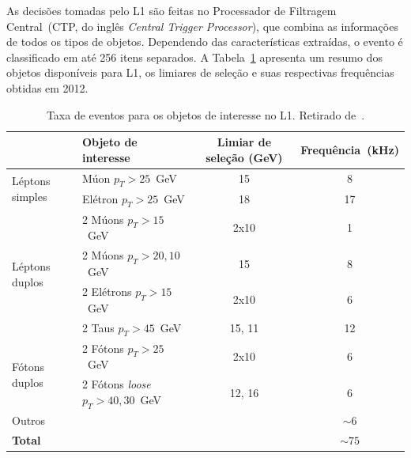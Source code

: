 As decisões tomadas pelo L1 são feitas no Processador de  Filtragem
Central~(CTP, do inglês \emph{Central Trigger Processor}), que combina as
informações de todos os tipos de objetos.  Dependendo das características
extraídas, o evento é classificado em até 256 itens separados. A
Tabela~\ref{table:l1objects} apresenta um resumo dos objetos disponíveis para
L1, os limiares de seleção e suas respectivas frequências obtidas em 2012.

\begin{table}[htbp!]\footnotesize
  \centering
  \tabcolsep=0.08cm
  \begin{tabular}{ l  m{5cm} c c }
      \toprule
                                          & Objeto de interesse & Limiar de seleção (GeV) & Frequência~(kHz) \\
      \midrule
      \multirow{2}{*}{Léptons simples}    & Múon $p_T > 25$~GeV        &      15             & 8        \\
                                          & Elétron $p_T > 25$~GeV     &      18             & 17       \\
      \midrule
      \multirow{4}{*}{Léptons duplos}     & 2 Múons $p_T > 15$~GeV     &      2x10           & 1        \\
                                          & 2 Múons $p_T > 20,10$~GeV  &      15             & 8        \\
                                          & 2 Elétrons $p_T > 15$~GeV  &      2x10           & 6        \\
                                          & 2 Taus $p_T > 45$~GeV      &      15, 11         & 12       \\
      \midrule
      \multirow{2}{*}{Fótons  duplos}     & 2 Fótons $p_T > 25$~GeV    &   2x10              & 6        \\
                                          & 2 Fótons \emph{loose} $p_T > 40,30$~GeV & 12, 16 & 6        \\
      \midrule
      Outros                              &                            &                     & $\sim 6$ \\
      \midrule
      {\bf Total}                         &                            &                     & $\sim 75$ \\
      \bottomrule
  \end{tabular}
  \caption[Taxa de eventos para os objetos de interesse no L1.]{Taxa de eventos
  para os objetos de interesse no L1. Retirado de~\cite{PETERSEN}.}
  \label{table:l1objects}
\end{table}

